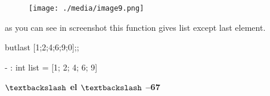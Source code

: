 \documentclass[12pt]{article}
\renewcommand{\_}{\kern-1.5pt\textunderscore\kern-1.5pt}
\begin{document}
\vspace{\baselineskip}



\begin{figure}[H]
	\begin{Center}
		\texttt{[image: ./media/image9.png]}
	\end{Center}
\end{figure}



\par


\vspace{\baselineskip}
{\fontsize{14pt}{16.8pt}\selectfont as you can see in screenshot this function gives list except last element.\par}\par

{\fontsize{14pt}{16.8pt}\selectfont butlast [1;2;4;6;9;0];;\par}\par

{\fontsize{14pt}{16.8pt}\selectfont - : int list = [1; 2; 4; 6; 9]\par}\par


\vspace{\baselineskip}

\vspace{\baselineskip}

\vspace{\baselineskip}

\vspace{\baselineskip}

\vspace{\baselineskip}

\vspace{\baselineskip}

\vspace{\baselineskip}

\vspace{\baselineskip}

\vspace{\baselineskip}
{\fontsize{14pt}{16.8pt}\selectfont \textbf{$\textbackslash$ el $\textbackslash$  --67}\par}\par



\end{document}
